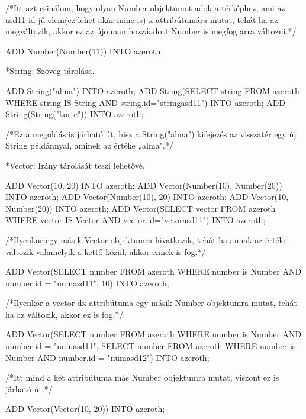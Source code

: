 /*Itt azt csinálom, hogy olyan Number objektumot adok a térképhez, ami az asd11 id-jű elem(ez lehet akár mine is) x attribútumára mutat, tehát ha az megváltozik, akkor ez az újonnan hozzáadott Number is megfog arra változni.*/

\begin{sql}
ADD Number(Number(11)) INTO azeroth;
\end{sql}

*String: Szöveg tárolása.

\begin{sql}
ADD String("alma") INTO azeroth;
ADD String(SELECT string FROM azeroth WHERE string IS String AND string.id="stringasd11") INTO azeroth;
ADD String(String("körte")) INTO azeroth;
\end{sql}

/*Ez a megoldás is járható út, hisz a String("alma") kifejezés az visszatér egy új String példánnyal, aminek az értéke „alma".*/

*Vector: Irány tárolását teszi lehetővé.

\begin{sql}
ADD Vector(10, 20) INTO azeroth;
ADD Vector(Number(10), Number(20)) INTO azeroth;
ADD Vector(Number(10), 20) INTO azeroth;
ADD Vector(10, Number(20)) INTO azeroth;
ADD Vector(SELECT vector FROM azeroth WHERE vector IS Vector AND vector.id="vetorasd11") INTO azeroth;
\end{sql}

/*Ilyenkor egy másik Vector objektumra hivatkozik, tehát ha annak az értéke változik valamelyik a kettő közül, akkor ennek is fog.*/

\begin{sql}
ADD Vector(SELECT number FROM azeroth WHERE number is Number AND number.id = "numasd11", 10) INTO azeroth;
\end{sql}

/*Ilyenkor a vector dx attribútuma egy másik Number objektumra mutat, tehát ha az változik, akkor ez is fog.*/

\begin{sql}
ADD Vector(SELECT number FROM azeroth WHERE number is Number AND number.id = "numasd11", SELECT number FROM azeroth WHERE number is Number AND number.id = "numasd12") INTO azeroth;
\end{sql}

/*Itt mind a két attribútuma más Number objektumra mutat, viszont ez is járható út.*/

\begin{sql}
ADD Vector(Vector(10, 20)) INTO azeroth;
\end{sql}

